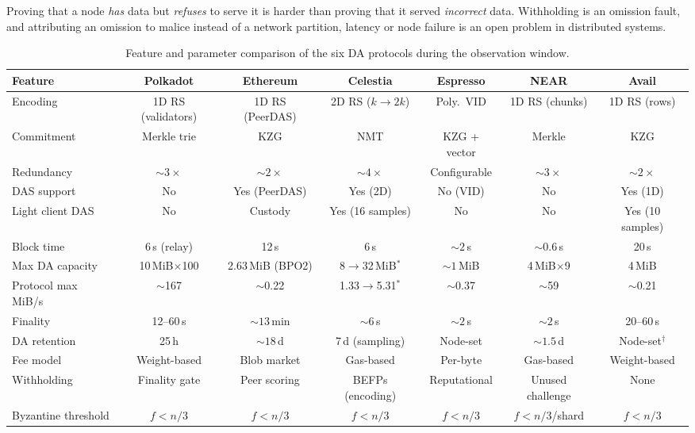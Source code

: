 Proving that a node \emph{has} data but \emph{refuses} to serve it is harder than proving that it served \emph{incorrect} data.
Withholding is an omission fault, and attributing an omission to malice instead of a network partition, latency or node failure is an open problem in distributed systems.


\begin{table}[t]
\centering
\caption{Feature and parameter comparison of the six DA protocols during the observation window.}
\label{tab:feature_comparison}
\setlength{\tabcolsep}{1.8pt}
\renewcommand{\arraystretch}{1.15}
\footnotesize
\begin{tabular}{l c c c c c c}
\toprule
\textbf{Feature} & \textbf{Polkadot} & \textbf{Ethereum} & \textbf{Celestia} & \textbf{Espresso} & \textbf{NEAR} & \textbf{Avail} \\
\midrule
Encoding &
  1D RS (validators) &
  1D RS (PeerDAS) &
  2D RS ($k{\to}2k$) &
  Poly.\ VID &
  1D RS (chunks) &
  1D RS (rows) \\
Commitment &
  Merkle trie &
  KZG &
  NMT &
  KZG + vector &
  Merkle &
  KZG \\
Redundancy &
  ${\sim}3\times$ &
  ${\sim}2\times$ &
  ${\sim}4\times$ &
  Configurable &
  ${\sim}3\times$ &
  ${\sim}2\times$ \\
DAS support &
  No &
  Yes (PeerDAS) &
  Yes (2D) &
  No (VID) &
  No &
  Yes (1D) \\
Light client DAS &
  No &
  Custody &
  Yes (16 samples) &
  No &
  No &
  Yes (10 samples) \\
Block time &
  6\,s (relay) &
  12\,s &
  6\,s &
  ${\sim}2$\,s &
  ${\sim}0.6$\,s &
  20\,s \\
Max DA capacity &
  10\,MiB$\times$100 &
  2.63\,MiB (BPO2) &
  8$\to$32\,MiB$^\ast$ &
  ${\sim}1$\,MiB &
  4\,MiB$\times$9 &
  4\,MiB \\
Protocol max MiB/s & $\sim$167 & $\sim$0.22 & 1.33$\to$5.31$^\ast$ & $\sim$0.37 & $\sim$59 & $\sim$0.21 \\
Finality &
  12--60\,s &
  ${\sim}13$\,min &
  ${\sim}6$\,s &
  ${\sim}2$\,s &
  ${\sim}2$\,s &
  20--60\,s \\
DA retention &
  25\,h &
  ${\sim}18$\,d &
  7\,d (sampling) &
  Node-set &
  ${\sim}1.5$\,d &
  Node-set$^\dagger$ \\
Fee model &
  Weight-based &
  Blob market &
  Gas-based &
  Per-byte &
  Gas-based &
  Weight-based \\
Withholding &
  Finality gate &
  Peer scoring &
  BEFPs (encoding) &
  Reputational &
  Unused challenge &
  None \\
Byzantine threshold &
  $f < n/3$ &
  $f < n/3$ &
  $f < n/3$ &
  $f < n/3$ &
  $f<n/3$/shard &
  $f < n/3$ \\
\bottomrule
\end{tabular}


\end{table}
